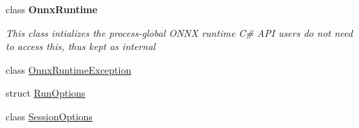 \begin{DoxyCompactItemize}
\item 
class {\bfseries Onnx\+Runtime}
\begin{DoxyCompactList}\small\item\em This class intializes the process-\/global O\+N\+NX runtime C\# A\+PI users do not need to access this, thus kept as internal \end{DoxyCompactList}\item 
class \mbox{\hyperlink{classMicrosoft_1_1ML_1_1OnnxRuntime_1_1OnnxRuntimeException}{Onnx\+Runtime\+Exception}}
\item 
struct \mbox{\hyperlink{structMicrosoft_1_1ML_1_1OnnxRuntime_1_1RunOptions}{Run\+Options}}
\item 
class \mbox{\hyperlink{classMicrosoft_1_1ML_1_1OnnxRuntime_1_1SessionOptions}{Session\+Options}}
\end{DoxyCompactItemize}
